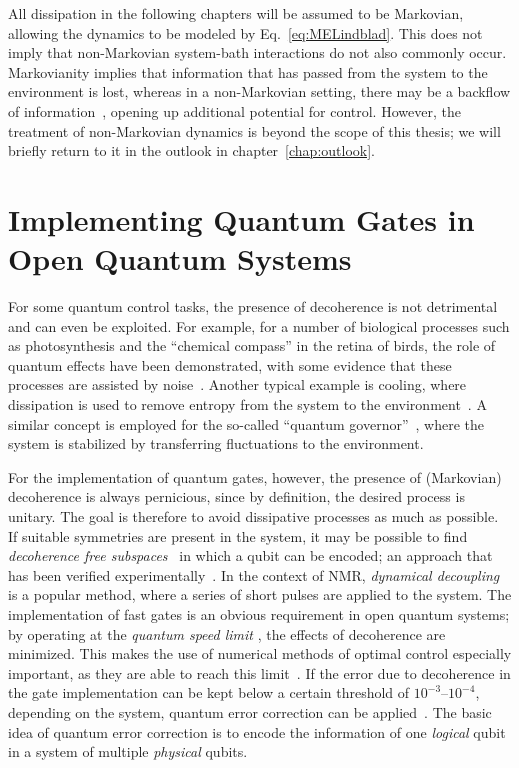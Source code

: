 All dissipation in the following chapters will be assumed to be Markovian,
allowing the dynamics to be modeled by Eq.~\eqref{eq:MELindblad}. This does not
imply that non-Markovian system-bath interactions do not also commonly occur.
Markovianity implies that information that has passed from the system to the
environment is lost, whereas in a non-Markovian setting, there may be a backflow
of information~\cite{BreuerPRL2009,BreuerJPB2012}, opening up additional
potential for control. However, the treatment of non-Markovian dynamics is
beyond the scope of this thesis; we will briefly return to it in the outlook in
chapter~\ref{chap:outlook}.


\section{Implementing Quantum Gates in Open Quantum Systems}
\label{sec:quantum_counter_decoherence}

For some quantum control tasks, the presence of decoherence is not detrimental
and can even be exploited. For example, for a number of biological processes
such as photosynthesis and the ``chemical compass'' in the retina of birds, the
role of quantum effects have been demonstrated, with some evidence that these
processes are assisted by noise~\cite{HuelgaCP2013}.
Another typical example is cooling, where dissipation is
used to remove entropy from the system to the environment~\cite{BartanaJCP93}.
A similar concept is employed for the so-called ``quantum
governor''~\cite{KallushPRA06}, where the system is stabilized by transferring
fluctuations to the environment.

For the implementation of quantum gates, however, the presence of (Markovian)
decoherence is always pernicious, since by definition, the desired process is
unitary. The goal is therefore to avoid dissipative processes as much as
possible. If suitable symmetries are present in the system, it may be possible
to find \emph{decoherence free subspaces}~\cite{LidarPRL1998}
%
in which a qubit can be encoded; an approach that has been verified
experimentally~\cite{ViolaS2001}. In the context of NMR,
\emph{dynamical decoupling}~\cite{ViolaPRL1999} is a popular method, where
%
a series of short pulses are applied to the system.
The implementation of fast gates is an obvious requirement in open quantum
systems; by operating at the \emph{quantum speed limit}
\cite{CampoPRL2013,DeffnerPRL2013,LevitinPRL2009,MargolusPD1998,BhattacharyyaJPA1983},
%
the effects of decoherence are minimized. This makes the use of numerical
methods of optimal control especially important, as they are able to reach this
limit~\cite{CanevaPRL09, GoerzJPB11}.
If the error due to decoherence in the gate implementation can be kept below
a certain threshold of $10^{-3}$--$10^{-4}$, depending on the system, quantum
error correction can be applied~\cite[and references therein]{DevittRPP2013}.
The basic idea of quantum error correction is to encode the information of one
\emph{logical} qubit in a system of multiple \emph{physical} qubits.
%

